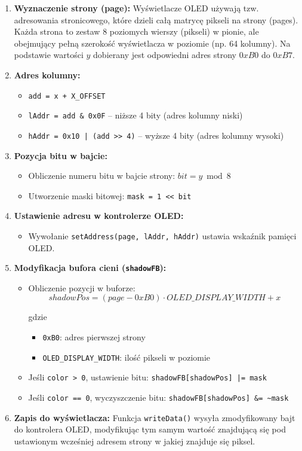 \documentclass[a4paper,12pt]{report}
\begin{document}
\begin{enumerate}
    \item \textbf{Wyznaczenie strony (page):} Wyświetlacze OLED używają tzw. adresowania stronicowego, które dzieli całą matrycę pikseli na strony (pages). Każda strona to zestaw 8 poziomych wierszy (pikseli) w pionie, ale obejmujący pełną szerokość wyświetlacza w poziomie (np. 64 kolumny). Na podstawie wartości $y$ dobierany jest odpowiedni adres strony $0xB0$ do $0xB7$.
    \item \textbf{Adres kolumny:}
      \begin{itemize}
          \item \texttt{add = x + X\_OFFSET}
          \item \texttt{lAddr = add \& 0x0F} – niższe 4 bity (adres kolumny niski)
          \item \texttt{hAddr = 0x10 | (add >> 4)} – wyższe 4 bity (adres kolumny wysoki)
      \end{itemize}
    \item \textbf{Pozycja bitu w bajcie:}
      \begin{itemize}
          \item Obliczenie numeru bitu w bajcie strony: $bit = y \bmod 8$
          \item Utworzenie maski bitowej: \texttt{mask = 1 << bit}
      \end{itemize}
    \item \textbf{Ustawienie adresu w kontrolerze OLED:}
      \begin{itemize}
          \item Wywołanie \texttt{setAddress(page, lAddr, hAddr)} ustawia wskaźnik pamięci OLED.
      \end{itemize}
    \item \textbf{Modyfikacja bufora cieni (\texttt{shadowFB}):}
      \begin{itemize}
          \item Obliczenie pozycji w buforze: 
          \[
          shadowPos = (page - 0xB0) \cdot OLED\_DISPLAY\_WIDTH + x
          \]

          gdzie 
          \begin{itemize}
            \item \texttt{0xB0}: adres pierwszej strony
            \item \texttt{OLED\_DISPLAY\_WIDTH}: ilość pikseli w poziomie
          \end{itemize}
          \item Jeśli \texttt{color > 0}, ustawienie bitu: \texttt{shadowFB[shadowPos] |= mask}
          \item Jeśli \texttt{color == 0}, wyczyszczenie bitu: \texttt{shadowFB[shadowPos] \&= \textasciitilde mask}
      \end{itemize}
    \item \textbf{Zapis do wyświetlacza:} Funkcja \texttt{writeData()} wysyła zmodyfikowany bajt do kontrolera OLED, modyfikując tym samym wartość znajdującą się pod ustawionym wcześniej adresem strony w jakiej znajduje się piksel.
  \end{enumerate}
  \vspace{10pt}
\end{document}

